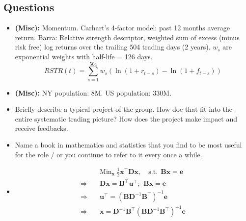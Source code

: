 \documentclass[9pt, landscape]{article}
\begin{document}
\begin{multicols*}{3}
\section{Questions}
\begin{itemize}
	\item \textbf{(Misc):} Momentum. Carhart's 4-factor model: past 12 months average return. Barra: Relative strength descriptor, weighted sum of excess (minus risk free) log returns over the trailing 504 trading days (2 years). $w_s$ are exponential weights with half-life = 126 days.
	$$
	RSTR(t) = \sum_{s=1}^{504} w_s (\ln(1+r_{t-s}) - \ln(1+f_{t-s}))
	$$
	\item \textbf{(Misc):} NY population: 8M. US population: 330M.
	\item Briefly describe a typical project of the group. How doe that fit into the entire systematic trading picture? How does the project make impact and receive feedbacks.
	\item Name a book in mathematics and statistics that you find to be most useful for the role / or you continue to refer to it every once a while.
	\item
	\begin{equation}
		\begin{split}
			&\text{Min}_{\bm{x}}~ \frac{1}{2} \bm{x}^{\top} \bm{D} \bm{x}, \quad \text{s.t.}~~\bm{B x} = \bm{e} \\
			\Rightarrow\quad & \bm{D x} = \bm{B}^{\top} \bm{u}^{\top};~~\bm{Bx} = \bm{e} \\
			\Rightarrow\quad & \bm{u}^{\top} = (\bm{B} \bm{D}^{-1} \bm{B}^{\top})^{-1} \bm{e} \\
			\Rightarrow\quad & \bm{x} = \bm{D}^{-1} \bm{B}^{\top} (\bm{B} \bm{D}^{-1} \bm{B}^{\top})^{-1} \bm{e}
		\end{split}
	\end{equation}
\end{itemize}

\end{multicols*}
\end{document}
